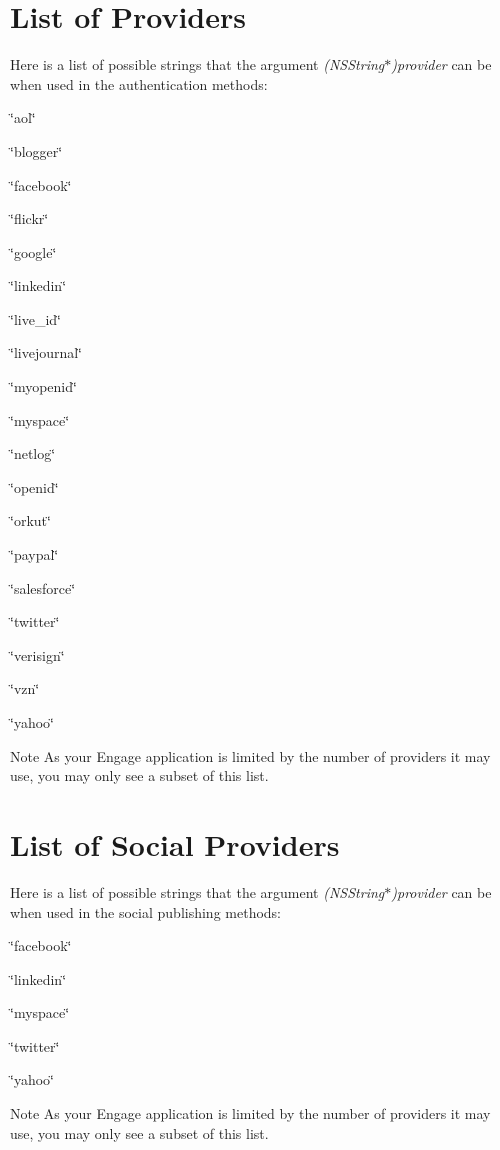 \hypertarget{_providers_basicProviders}{}\section{List of Providers}\label{_providers_basicProviders}
Here is a list of possible strings that the argument {\itshape (NSString$\ast$)provider\/} can be when used in the authentication methods:
\begin{DoxyItemize}
\item \char`\"{}aol\char`\"{}
\item \char`\"{}blogger\char`\"{}
\item \char`\"{}facebook\char`\"{}
\item \char`\"{}flickr\char`\"{}
\item \char`\"{}google\char`\"{}
\item \char`\"{}linkedin\char`\"{}
\item \char`\"{}live\_\-id\char`\"{}
\item \char`\"{}livejournal\char`\"{}
\item \char`\"{}myopenid\char`\"{}
\item \char`\"{}myspace\char`\"{}
\item \char`\"{}netlog\char`\"{}
\item \char`\"{}openid\char`\"{}
\item \char`\"{}orkut\char`\"{}
\item \char`\"{}paypal\char`\"{}
\item \char`\"{}salesforce\char`\"{}
\item \char`\"{}twitter\char`\"{}
\item \char`\"{}verisign\char`\"{}
\item \char`\"{}vzn\char`\"{}
\item \char`\"{}yahoo\char`\"{}
\end{DoxyItemize}

\begin{DoxyNote}{Note}
As your Engage application is limited by the number of providers it may use, you may only see a subset of this list.
\end{DoxyNote}
\hypertarget{_providers_socialProviders}{}\section{List of Social Providers}\label{_providers_socialProviders}
Here is a list of possible strings that the argument {\itshape (NSString$\ast$)provider\/} can be when used in the social publishing methods:
\begin{DoxyItemize}
\item \char`\"{}facebook\char`\"{}
\item \char`\"{}linkedin\char`\"{}
\item \char`\"{}myspace\char`\"{}
\item \char`\"{}twitter\char`\"{}
\item \char`\"{}yahoo\char`\"{}
\end{DoxyItemize}

\begin{DoxyNote}{Note}
As your Engage application is limited by the number of providers it may use, you may only see a subset of this list. 
\end{DoxyNote}
